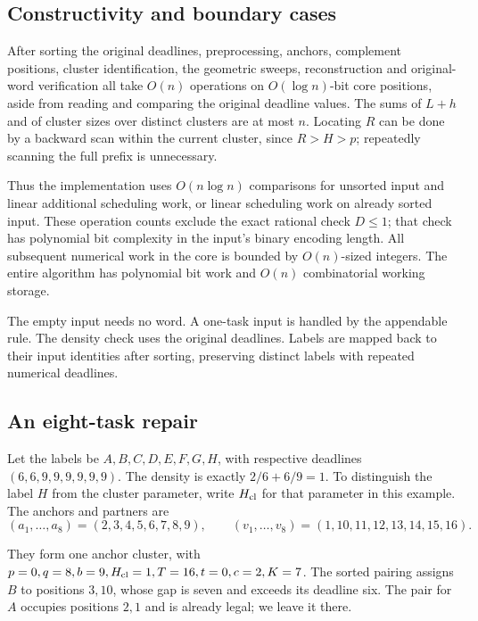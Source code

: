 \documentclass[11pt,a4paper]{article}
\begin{document}
\hypertarget{constructivity-and-boundary-cases}{%
\subsection{Constructivity and boundary cases}\label{constructivity-and-boundary-cases}}

After sorting the original deadlines, preprocessing, anchors, complement positions, cluster identification, the geometric sweeps, reconstruction and original-word verification all take \(O(n)\) operations on \(O(\log n)\)-bit core positions, aside from reading and comparing the original deadline values. The sums of \(L+h\) and of cluster sizes over distinct clusters are at most \(n\). Locating \(R\) can be done by a backward scan within the current cluster, since \(R>H>p\); repeatedly scanning the full prefix is unnecessary.

Thus the implementation uses \(O(n\log n)\) comparisons for unsorted input and linear additional scheduling work, or linear scheduling work on already sorted input. These operation counts exclude the exact rational check \(D\le1\); that check has polynomial bit complexity in the input's binary encoding length. All subsequent numerical work in the core is bounded by \(O(n)\)-sized integers. The entire algorithm has polynomial bit work and \(O(n)\) combinatorial working storage.

The empty input needs no word. A one-task input is handled by the appendable rule. The density check uses the original deadlines. Labels are mapped back to their input identities after sorting, preserving distinct labels with repeated numerical deadlines.

\hypertarget{an-eight-task-repair}{%
\subsection{An eight-task repair}\label{an-eight-task-repair}}

Let the labels be \(A,B,C,D,E,F,G,H\), with respective deadlines \((6,6,9,9,9,9,9,9)\). The density is exactly \(2/6+6/9=1\). To distinguish the label \(H\) from the cluster parameter, write \(H_{\rm cl}\) for that parameter in this example. The anchors and partners are
\[
(a_1,\ldots,a_8)=(2,3,4,5,6,7,8,9),\qquad
(v_1,\ldots,v_8)=(1,10,11,12,13,14,15,16).
\]

They form one anchor cluster, with \(p=0,q=8,b=9,H_{\rm cl}=1,T=16,t=0,c=2,K=7\). The sorted pairing assigns \(B\) to positions \(3,10\), whose gap is seven and exceeds its deadline six. The pair for \(A\) occupies positions \(2,1\) and is already legal; we leave it there.
\end{document}
